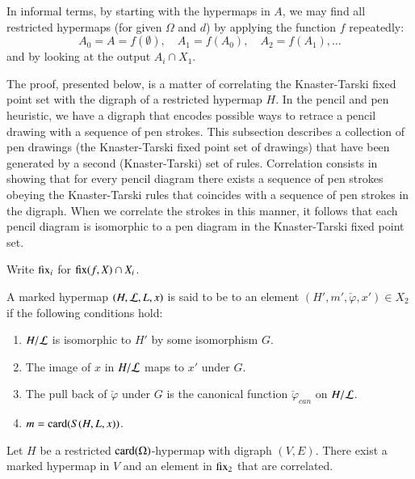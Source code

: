 In informal terms, by starting with the  hypermaps in
$A$, we may find all restricted hypermaps (for given $\Omega$ and $d$)
by applying the function $f$ repeatedly:
\[ 
A_0 = A = f(\emptyset),\quad A_1 = f(A_0),\quad A_2 = f(A_1),\ldots
\] 
and by looking at the output $A_i \cap X_1$.
%

The proof, presented below, is a matter of
correlating the Knaster-Tarski fixed point set with the digraph of a
restricted hypermap $H$.  In the pencil and pen heuristic, we have a
digraph that encodes possible ways to retrace a pencil drawing with a
sequence of pen strokes.  This subsection describes a collection of
pen drawings (the Knaster-Tarski fixed point set of drawings) that
have been generated by a second (Knaster-Tarski) set of rules.
Correlation consists in showing that for every pencil diagram there exists
 a sequence of pen strokes obeying the Knaster-Tarski rules that
coincides with a sequence of pen strokes in the digraph. When we
correlate the strokes in this manner, it  follows that each pencil
diagram is isomorphic to a pen diagram in the Knaster-Tarski fixed
point set.  %


Write ${\operatorname{fix}}_i$ for ${\operatorname{fix}}(f,X)\cap X_i$.


\begin{definition}[correlation]
  A marked hypermap $(H,{\cal L},L,x)$ is said to be
   to an element $(H',m',\check\varphi,x')\in X_2$ if
  the following conditions hold:
\begin{enumerate}\wasitemize 
\item $H/{\cal L}$ is isomorphic to $H'$ by some isomorphism $G$.
\item The image of $x$ in $H/{\cal L}$ maps to $x'$ under $G$.
\item The pull back of $\check\varphi$ under $G$ is the canonical function
$\check\varphi_{can}$ on $H/{\cal L}$.
\item $m = {\operatorname{card}}(S(H,L,x))$.
\end{enumerate}\wasitemize 
\end{definition}

\begin{lemma}\label{lemma:correlated-seed}
  Let $H$ be a restricted ${\operatorname{card}}(\Omega)$-hypermap with digraph
  $(V,E)$.  There exist a marked hypermap in $V$ and an element in
  ${\operatorname{fix}}_2$ that are correlated.
\end{lemma}

